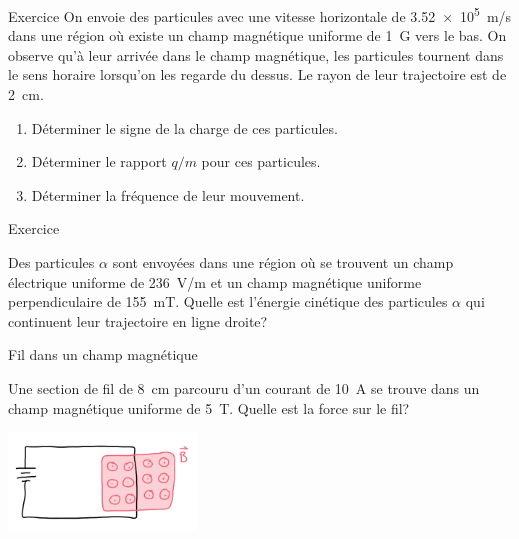 \documentclass{beamer}
\begin{document}
\begin{frame}[t]{Exercice}
On envoie des particules avec une vitesse horizontale de \SI{3.52e5}{m/s} dans
une région où existe un champ magnétique uniforme de \SI{1}{G} vers le bas. On
observe qu'à leur arrivée dans le champ magnétique, les particules tournent
dans le sens horaire lorsqu'on les regarde du dessus. Le rayon de leur
trajectoire est de \SI{2}{cm}.

\begin{enumerate}
  \item Déterminer le signe de la charge de ces particules.
  \item Déterminer le rapport $q/m$ pour ces particules.
  \item Déterminer la fréquence de leur mouvement.
\end{enumerate}
\end{frame}


\begin{frame}[t]{Exercice}

Des particules $\alpha$ sont envoyées dans une région où se trouvent un champ
électrique uniforme de \SI{236}{V/m} et un champ magnétique uniforme
perpendiculaire de \SI{155}{mT}. Quelle est l'énergie cinétique des particules
$\alpha$ qui continuent leur trajectoire en ligne droite?

\end{frame}






\begin{frame}{Fil dans un champ magnétique}

  Une section de fil de \SI{8}{\centi\meter} parcouru d'un courant de
  \SI{10}{\ampere} se trouve dans un champ magnétique uniforme de
  \SI{5}{\tesla}. Quelle est la force sur le fil?

  \begin{center}
    \includegraphics[width=5cm]{figures/fil_dans_mag.png}
  \end{center}
\end{frame}
\end{document}
